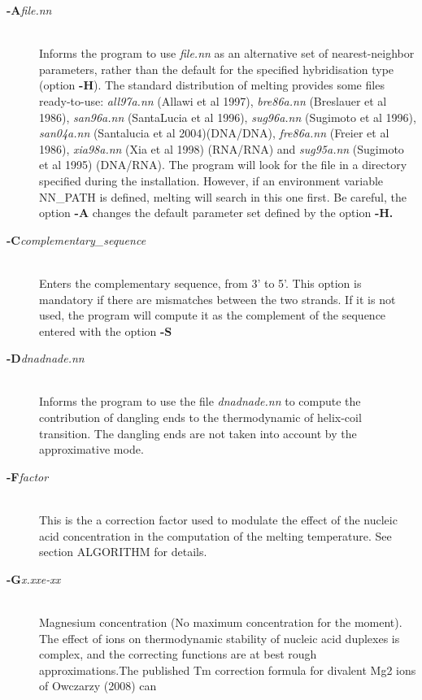 \documentclass{article}
\begin{document}
\begin{description}
\item [\textbf{-A}\textit{file.nn}] \mbox{}\\
  Informs the program to use \textit{file.nn} as an alternative set of
  nearest-neighbor parameters, rather than the default for the specified
  hybridisation type (option \textbf{-H}). The standard distribution of melting
  provides some files ready-to-use: \textit{all97a.nn} (Allawi et al 1997),
  \textit{bre86a.nn} (Breslauer et al 1986), \textit{san96a.nn} (SantaLucia et
  al 1996), \textit{sug96a.nn} (Sugimoto et al 1996), \textit{san04a.nn} (Santalucia 
  et al 2004)(DNA/DNA),
  \textit{fre86a.nn} (Freier et al 1986), \textit{xia98a.nn} (Xia et al 1998)
  (RNA/RNA) and \textit{sug95a.nn} (Sugimoto et al 1995) (DNA/RNA). The program
  will look for the file in a directory specified during the installation.
  However, if an environment variable NN\_PATH is defined, melting will search
  in this one first. Be careful, the option \textbf{-A } changes the default
  parameter set defined by the option \textbf{-H.}
\item [\textbf{-C}\textit{complementary\_sequence}] \mbox{}\\
  Enters the complementary sequence, from 3' to 5'. This option is mandatory if
  there are mismatches between the two strands. If it is not used, the program
  will compute it as the complement of the sequence entered with the option
  \textbf{-S}
\item [\textbf{-D}\textit{dnadnade.nn}]\mbox{}\\
  Informs the program to use the file \textit{dnadnade.nn} to compute the
  contribution of dangling ends to the thermodynamic of helix-coil transition.
  The dangling ends are not taken into account by the approximative mode.
\item [\textbf{-F}\textit{factor}  ]\mbox{}\\
  This is the a correction factor used to modulate the effect of the nucleic
  acid concentration in the computation of the melting temperature. See section
  ALGORITHM for details.
\item [\textbf{-G}\textit{x.xxe-xx}  ]\mbox{}\\
  Magnesium  concentration  (No maximum concentration for the moment). The effect  
  of  ions  on  thermodynamic  stability  of nucleic  acid duplexes is complex,
  and the correcting functions are  at  best rough  approximations.The published 
  Tm  correction formula for divalent Mg2 ions of  Owczarzy  (2008) can

\end{description}
\end{document}
